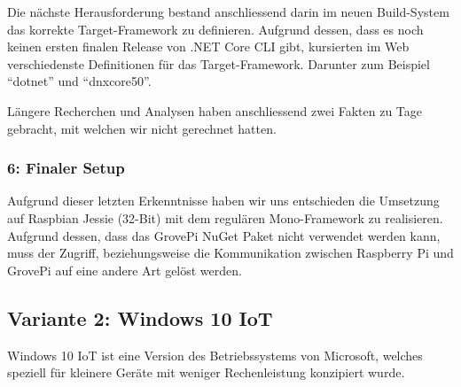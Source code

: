 
Die nächste Herausforderung bestand anschliessend darin im neuen Build-System das korrekte Target-Framework zu definieren. Aufgrund dessen, dass es noch keinen ersten finalen Release von .NET Core CLI gibt, kursierten im Web verschiedenste Definitionen für das Target-Framework. Darunter zum Beispiel "`dotnet"' und "`dnxcore50"'.

Längere Recherchen und Analysen haben anschliessend zwei Fakten zu Tage gebracht, mit welchen wir nicht gerechnet hatten.
\begin{itemize}
\end{itemize}


\subsubsection{6: Finaler Setup}
Aufgrund dieser letzten Erkenntnisse haben wir uns entschieden die Umsetzung auf Raspbian Jessie (32-Bit) mit dem regulären Mono-Framework zu realisieren. Aufgrund dessen, dass das GrovePi NuGet Paket nicht verwendet werden kann, muss der Zugriff, beziehungsweise die Kommunikation zwischen Raspberry Pi und GrovePi auf eine andere Art gelöst werden.


\subsection{Variante 2: Windows 10 IoT}
Windows 10 IoT ist eine Version des Betriebssystems von Microsoft, welches speziell für kleinere Geräte mit weniger Rechenleistung konzipiert wurde.

